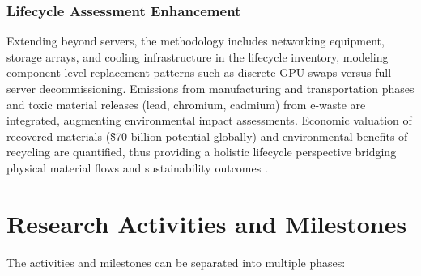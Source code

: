 \documentclass[a4paper, 12pt]{article}
\begin{document}
\subsubsection{Lifecycle Assessment Enhancement}
Extending beyond servers, the methodology includes networking equipment, storage arrays, and cooling infrastructure in the lifecycle inventory, modeling component-level replacement patterns such as discrete GPU swaps versus full server decommissioning. Emissions from manufacturing and transportation phases and toxic material releases (lead, chromium, cadmium) from e-waste are integrated, augmenting environmental impact assessments. Economic valuation of recovered materials (\~\$70 billion potential globally) and environmental benefits of recycling are quantified, thus providing a holistic lifecycle perspective bridging physical material flows and sustainability outcomes \citep{wang_2024_ewaste}.

\section{Research Activities and Milestones}

The activities and milestones can be separated into multiple phases:
\end{document}
